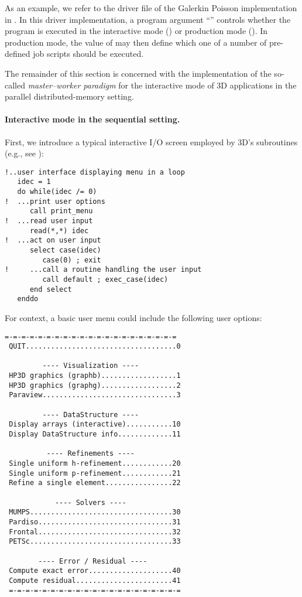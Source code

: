 As an example, we refer to the driver file  of the Galerkin Poisson implementation in . In this driver implementation, a program argument ``'' controls whether the program is executed in the interactive mode () or production mode (). In production mode, the value of  may then define which one of a number of pre-defined job scripts should be executed. 

The remainder of this section is concerned with the implementation of the so-called \emph{master--worker paradigm} for the interactive mode of \hp3D applications in the parallel distributed-memory setting.

\paragraph{Interactive mode in the sequential setting.}
First, we introduce a typical interactive I/O screen employed by \hp3D's subroutines (e.g., see ):

\begin{lstlisting}[caption=Interactive mode in shared-memory execution., label={lst:interactive_mode_sequential}]
!..user interface displaying menu in a loop
   idec = 1
   do while(idec /= 0)
!  ...print user options
      call print_menu
!  ...read user input
      read(*,*) idec
!  ...act on user input
      select case(idec)
         case(0) ; exit
!     ...call a routine handling the user input
         call default ; exec_case(idec)
      end select
   enddo
\end{lstlisting}

For context, a basic user menu could include the following user options:

\begin{lstlisting}[caption=A basic interactive-mode user menu., label={lst:interactive_mode_menu}]
 =-=-=-=-=-=-=-=-=-=-=-=-=-=-=-=-=-=-=-=-=
 QUIT....................................0
 
         ---- Visualization ----        
 HP3D graphics (graphb)..................1
 HP3D graphics (graphg)..................2
 Paraview................................3
 
         ---- DataStructure ----       
 Display arrays (interactive)...........10
 Display DataStructure info.............11
 
          ---- Refinements ----            
 Single uniform h-refinement............20
 Single uniform p-refinement............21
 Refine a single element................22
 
            ---- Solvers ----              
 MUMPS..................................30
 Pardiso................................31
 Frontal................................32
 PETSc..................................33
 
        ---- Error / Residual ----        
 Compute exact error....................40
 Compute residual.......................41
 =-=-=-=-=-=-=-=-=-=-=-=-=-=-=-=-=-=-=-=-=
 \end{lstlisting}

